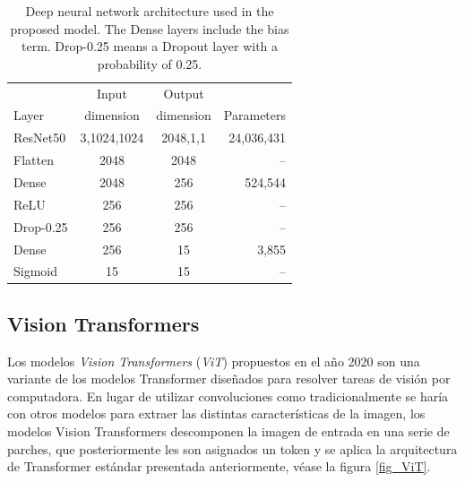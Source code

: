 {\begin{table}[!ht]
    \centering
    \begin{tabular}{| l|c | c | r |}
    \hline
                 &     Input   &  Output    &  \\
    Layer        &   dimension & dimension  & Parameters \\
    \hline\hline
    ResNet50     &     3,1024,1024 &     2048,1,1 & 24,036,431 \\
    Flatten      &     2048        &     2048     &  --        \\
    Dense        &     2048        &     256      & 524,544    \\
    ReLU         &     256         &     256      & --         \\
    Drop-0.25  &     256         &     256      & --         \\
    Dense        &     256         &     15       &  3,855     \\
    Sigmoid      &     15          &     15       & --         \\
    \hline
    \end{tabular}
    \caption{Deep neural network architecture used in the proposed model. The Dense layers include the bias term. Drop-0.25 means a Dropout layer with a probability of 0.25.}
    \label{table_resnet50}
\end{table}

\subsection{Vision Transformers}

Los modelos \textit{Vision Transformers} (\textit{ViT}) \cite{DBLP:journals/corr/abs-2010-11929} propuestos en el
año 2020 son una variante de los modelos Transformer diseñados para resolver tareas de visión por
computadora. En lugar de utilizar convoluciones como tradicionalmente se haría con otros modelos
para extraer las distintas características de la imagen, los modelos Vision Transformers descomponen
la imagen de entrada en una serie de parches, que posteriormente les son asignados un token y se
aplica la arquitectura de Transformer estándar presentada anteriormente, véase la figura \ref{fig_ViT}.

}
